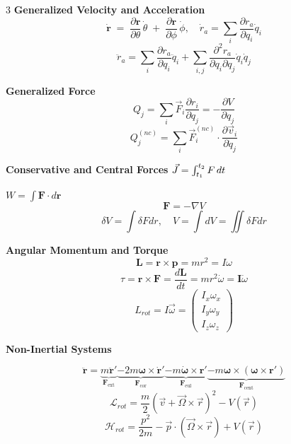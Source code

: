 \documentclass[1pt]{article}
\begin{document}
\begin{multicols}{3}
\textbf{Generalized Velocity and Acceleration}
\[\dot{\mathbf{r}}
\;=\;
\frac{\partial \mathbf{r}}{\partial \theta}\,\dot{\theta}
\;+\;
\frac{\partial \mathbf{r}}{\partial \phi}\,\dot{\phi},\quad     \dot{r}_a = \sum_i \frac{\partial r_a}{\partial q_i} \dot{q}_i
\]
\begin{equation*}
\end{equation*}
\begin{equation*}
    \ddot{r}_a = \sum_i \frac{\partial r_a}{\partial q_i} \ddot{q}_i + \sum_{i,j} \frac{\partial^2 r_a}{\partial q_i \partial q_j} \dot{q}_i \dot{q}_j
\end{equation*}

\textbf{Generalized Force}
\begin{equation*}
    Q_{j}=\sum_{i}\vec{F}_{i}\frac{\partial r_{i}}{\partial q_{j}}=-\frac{\partial V}{\partial q_j}
\end{equation*}
\begin{equation*}
    Q_j^{(nc)}=\sum_i \vec{F}_i^{(nc)} \cdot \frac{\partial \vec{v}_i}{\partial \dot{q}_j}
\end{equation*}

\textbf{Conservative and Central Forces} 
\(  \vec{J}=\intop_{t_{1}}^{t_{2}}F\,dt\)  \quad

\( W = \int \mathbf{F} \cdot d\mathbf{r} \) \quad  \quad
\[
\mathbf{F} = -\nabla V
\]
\[\delta V=\int\delta Fdr,\quad V=\int dV=\iint\delta Fdr\]

\textbf{Angular Momentum and Torque}
\begin{equation*}
    \mathbf{L} = \mathbf{r} \times \mathbf{p} = mr^2 = I\omega
\end{equation*}
\begin{equation*}
    \tau= \mathbf{r} \times \mathbf{F} = \frac{d\mathbf{L}}{dt} = mr^{2}\dot{\omega} = \mathbf{I}\dot{\omega}
\end{equation*}
\[L_{rot}=I\vec{\omega}=\begin{pmatrix}I_{x}\omega_{x}\\
I_{y}\omega_{y}\\
I_{z}\omega_{z}
\end{pmatrix}\]

\textbf{Non-Inertial Systems}

\[
\ddot{\mathbf{r}} = 
\underbrace{m\ddot{\mathbf{r}}'}_{\mathbf{F}_{\text{ext}}} 
 \underbrace{ -2m\boldsymbol{\omega} \times \dot{\mathbf{r}}'}_{\mathbf{F}_{\text{cor}}} 
 \underbrace{ -m\dot{\boldsymbol{\omega}} \times \mathbf{r}'}_{\mathbf{F}_{\text{eul}}} 
 \underbrace{ -m\boldsymbol{\omega} \times (\boldsymbol{\omega} \times \mathbf{r'})}_{\mathbf{F}_{\text{cent}}}
\]
\[\mathcal{L}_{rot}=\frac{m}{2}\left(\vec{v}+\vec{\Omega}\times\vec{r}\right)^{2}-V\left(\vec{r}\right)\]
\[\mathcal{H}_{rot}=\frac{p^{2}}{2m}-\vec{p}\cdot\left(\vec{\Omega}\times\vec{r}\right)+V\left(\vec{r}\right)\]


\end{multicols}
\end{document}
